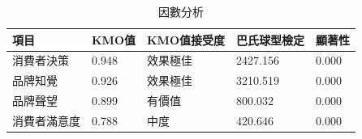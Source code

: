 \begin{table}[htb]
\caption{因數分析}
\label{tab:p4}
\renewcommand{\arraystretch}{1.2} %
\arrayrulewidth=1pt               %
\tabcolsep=16pt                   %
\begin{tabular}[t]{lllll}  %
\hline
 項目& KMO值 & KMO值接受度& 巴氏球型檢定&顯著性 \\
\hline
消費者決策&0.948&效果極佳&2427.156&0.000\\
 品牌知覺&0.926&效果極佳&3210.519&0.000\\
 品牌聲望&0.899&有價值&800.032&0.000 \\
消費者滿意度&0.788&中度&420.646&0.000\\
\hline
\end{tabular}
\end{table}

